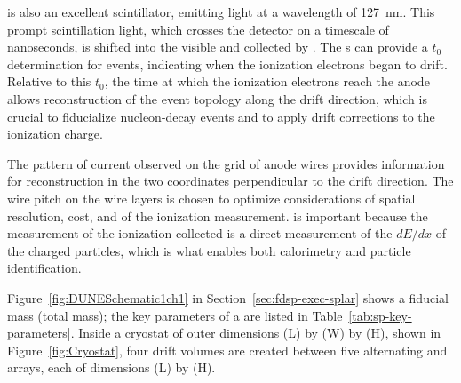  is also an excellent scintillator, emitting  light at a wavelength of \SI{127}{\nano\meter}. This prompt scintillation light, which crosses the detector on a timescale of nanoseconds, is shifted into the visible and collected by . The s can provide a $t_{0}$ determination for events, indicating when the ionization electrons began to drift. Relative to this $t_{0}$, the time at which the ionization electrons reach the anode allows reconstruction of the event topology along the drift direction, which is crucial to fiducialize nucleon-decay events and to apply drift corrections to the ionization charge.

The pattern of current observed on the grid of anode wires provides information for reconstruction in the two coordinates perpendicular to the drift direction. The wire pitch on the wire layers is chosen to optimize considerations of  spatial resolution, cost, and  of the ionization measurement.  is important because the measurement of the ionization collected is a direct measurement of the $dE/dx$ of the charged particles, which is what enables both calorimetry and particle identification.

Figure~\ref{fig:DUNESchematic1ch1} in Section~\ref{sec:fdsp-exec-splar} shows a \nominalmodsize fiducial mass  (\larmass total mass); the key parameters of a  are listed in Table~\ref{tab:sp-key-parameters}. Inside a cryostat of outer dimensions \cryostatlen (L) by \cryostatwdth (W) by \cryostatht{} (H), shown in Figure~\ref{fig:Cryostat}, four \spmaxdrift drift volumes are created between five alternating  and  arrays, each of dimensions \sptpclen (L) by \tpcheight (H).


